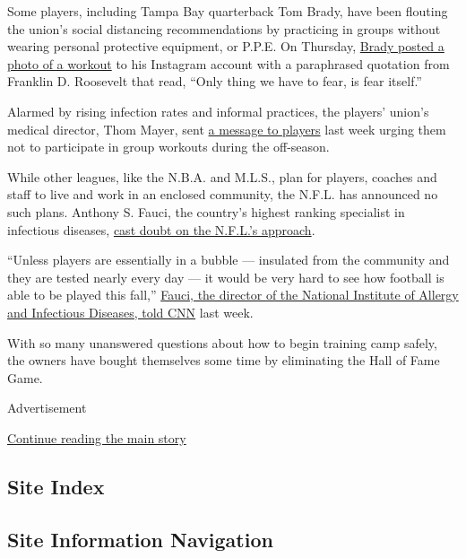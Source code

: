 Some players, including Tampa Bay quarterback Tom Brady, have been
flouting the union's social distancing recommendations by practicing in
groups without wearing personal protective equipment, or P.P.E. On
Thursday,
\href{https://twitter.com/gregauman/status/1276200193717948416}{Brady
posted a photo of a workout} to his Instagram account with a paraphrased
quotation from Franklin D. Roosevelt that read, ``Only thing we have to
fear, is fear itself.''

Alarmed by rising infection rates and informal practices, the players'
union's medical director, Thom Mayer, sent
\href{https://twitter.com/NFLPA/status/1274413716612792320}{a message to
players} last week urging them not to participate in group workouts
during the off-season.

While other leagues, like the N.B.A. and M.L.S., plan for players,
coaches and staff to live and work in an enclosed community, the N.F.L.
has announced no such plans. Anthony S. Fauci, the country's highest
ranking specialist in infectious diseases,
\href{https://www.nytimes3xbfgragh.onion/2020/06/18/sports/anthony-fauci-nfl-bubble-coronavirus.html}{cast
doubt on the N.F.L.'s approach}.

``Unless players are essentially in a bubble --- insulated from the
community and they are tested nearly every day --- it would be very hard
to see how football is able to be played this fall,''
\href{https://www.cnn.com/2020/06/18/us/football-happen-fauci-spt-trnd/index.html}{Fauci,
the director of the National Institute of Allergy and Infectious
Diseases, told CNN} last week.

With so many unanswered questions about how to begin training camp
safely, the owners have bought themselves some time by eliminating the
Hall of Fame Game.

Advertisement

\protect\hyperlink{after-bottom}{Continue reading the main story}

\hypertarget{site-index}{%
\subsection{Site Index}\label{site-index}}

\hypertarget{site-information-navigation}{%
\subsection{Site Information
Navigation}\label{site-information-navigation}}

